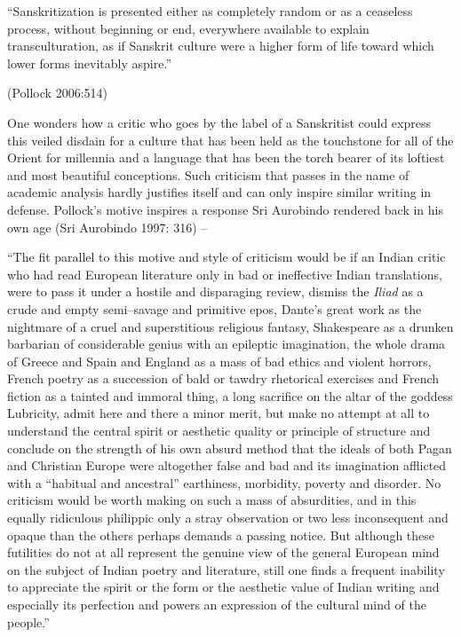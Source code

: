 \begin{myquote}
“Sanskritization is presented either as completely random or as a ceaseless process, without beginning or end, everywhere available to explain transculturation, as if Sanskrit culture were a higher form of life toward which lower forms inevitably aspire.”
\end{myquote}

\hfill (Pollock 2006:514)

One wonders how a critic who goes by the label of a Sanskritist could express this veiled disdain for a culture that has been held as the touchstone for all of the Orient for millennia and a language that has been the torch bearer of its loftiest and most beautiful conceptions. Such criticism that passes in the name of academic analysis hardly justifies itself and can only inspire similar writing in defense. Pollock’s motive inspires a response Sri Aurobindo rendered back in his own age (Sri Aurobindo 1997: 316) –

\begin{myquote}
“The fit parallel to this motive and style of criticism would be if an Indian critic who had read European literature only in bad or ineffective Indian translations, were to pass it under a hostile and disparaging review, dismiss the \textit{Iliad} as a crude and empty semi–savage and primitive epos, Dante’s great work as the nightmare of a cruel and superstitious religious fantasy, Shakespeare as a drunken barbarian of considerable genius with an epileptic imagination, the whole drama of Greece and Spain and England as a mass of bad ethics and violent horrors, French poetry as a succession of bald or tawdry rhetorical exercises and French fiction as a tainted and immoral thing, a long sacrifice on the altar of the goddess Lubricity, admit here and there a minor merit, but make no attempt at all to understand the central spirit or aesthetic quality or principle of structure and conclude on the strength of his own absurd method that the ideals of both Pagan and Christian Europe were altogether false and bad and its imagination afflicted with a “habitual and ancestral” earthiness, morbidity, poverty and disorder. No criticism would be worth making on such a mass of absurdities, and in this equally ridiculous philippic only a stray observation or two less inconsequent and opaque than the others perhaps demands a passing notice. But although these futilities do not at all represent the genuine view of the general European mind on the subject of Indian poetry and literature, still one finds a frequent inability to appreciate the spirit or the form or the aesthetic value of Indian writing and especially its perfection and powers an expression of the cultural mind of the people.”
\end{myquote}

